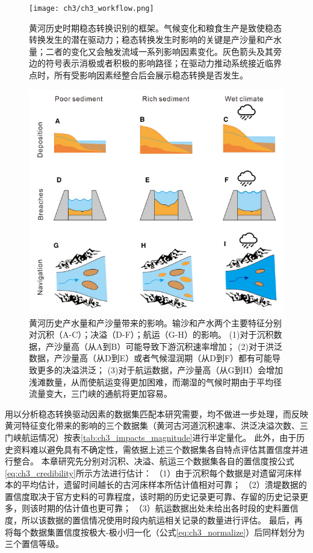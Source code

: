 \begin{figure}[htb] %
    \centering
    \texttt{[image: ch3/ch3\_workflow.png]}
    \caption[黄河历史时期稳态转换识别的框架]{黄河历史时期稳态转换识别的框架。气候变化和粮食生产是致使稳态转换发生的潜在驱动力；稳态转换发生时影响的关键是产沙量和产水量；二者的变化又会触发流域一系列影响因素变化。灰色箭头及其旁边的符号表示消极或者积极的影响路径；在驱动力推动系统接近临界点时，所有受影响因素经整合后会展示稳态转换是否发生。}\label{fig:ch3:regime_shift_detect}
\end{figure}

\begin{figure}[htb] %
    \centering
    \includegraphics[width=\textwidth]{img/ch3/ch3_impacts_diagram.png}
    \caption[黄河历史产水量和产沙量带来的影响]{黄河历史产水量和产沙量带来的影响。输沙和产水两个主要特征分别对沉积（A-C）；决溢（D-F）；航运（G-H）的影响。
    (1)对于沉积数据，产沙量高（从A到B）可能导致下游沉积速率增加\cite{xu2003a}；
    (2)对于洪泛数据，产沙量高（从D到E）或者气候湿润期（从D到F）都有可能导致更多的决溢洪泛\cite{chen2012}；
    (3)对于航运数据，产沙量高（从G到H）会增加浅滩数量，从而使航运变得更加困难，而潮湿的气候时期由于平均径流量变大，三门峡的通航将更加容易\cite{WangShouChun1993}。}\label{fig:ch3:impacts_diagram}
\end{figure}

用以分析稳态转换驱动因素的数据集匹配本研究需要，均不做进一步处理，而反映黄河特征变化带来的影响的三个数据集（黄河古河道沉积速率、洪泛决溢次数、三门峡航运情况）按表\ref{tab:ch3_impacts_magnitude}进行半定量化。
此外，由于历史资料难以避免具有不确定性，需依据上述三个数据集各自特点评估其置信度并进行整合。
本章研究先分别对沉积、决溢、航运三个数据集各自的置信度按公式\ref{eq:ch3_credibility}所示方法进行估计：
（1）由于沉积每个数据是对遗留河床样本的平均估计，遗留时间越长的古河床样本所估计值相对可靠；
（2）溃堤数据的置信度取决于官方史料的可靠程度，该时期的历史记录更可靠、存留的历史记录更多，则该时期的估计值也更可靠；
（3）航运数据出处未给出各时段的史料置信度，所以该数据的置信情况使用时段内航运相关记录的数量进行评估。
最后，再将每个数据集置信度按极大-极小归一化（公式\ref{eq:ch3_normalize}）后同样划分为三个置信等级。

